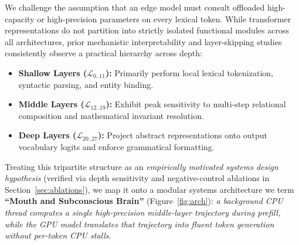 \documentclass[10pt,twocolumn]{article}
\begin{document}
We challenge the assumption that an edge model must consult offloaded high-capacity or high-precision parameters on every lexical token. While transformer representations do not partition into strictly isolated functional modules across all architectures, prior mechanistic interpretability and layer-skipping studies consistently observe a practical hierarchy across depth:
\begin{itemize}
    \item \textbf{Shallow Layers ($\mathcal{L}_{0..11}$):} Primarily perform local lexical tokenization, syntactic parsing, and entity binding.
    \item \textbf{Middle Layers ($\mathcal{L}_{12..19}$):} Exhibit peak sensitivity to multi-step relational composition and mathematical invariant resolution.
    \item \textbf{Deep Layers ($\mathcal{L}_{20..27}$):} Project abstract representations onto output vocabulary logits and enforce grammatical formatting.
\end{itemize}

Treating this tripartite structure as an \emph{empirically motivated systems design hypothesis} (verified via depth sensitivity and negative-control ablations in Section~\ref{sec:ablations}), we map it onto a modular systems architecture we term \textbf{``Mouth and Subconscious Brain''} (Figure~\ref{fig:arch}): \emph{a background CPU thread computes a single high-precision middle-layer trajectory during prefill, while the GPU model translates that trajectory into fluent token generation without per-token CPU stalls}.
\end{document}
